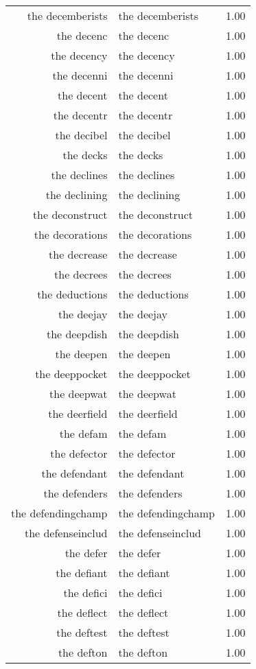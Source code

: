 \begin{table}[ht]
\begin{tabular}{rlr}
  the decemberists & the decemberists & 1.00 \\ 
  the decenc & the decenc & 1.00 \\ 
  the decency & the decency & 1.00 \\ 
  the decenni & the decenni & 1.00 \\ 
  the decent & the decent & 1.00 \\ 
  the decentr & the decentr & 1.00 \\ 
  the decibel & the decibel & 1.00 \\ 
  the decks & the decks & 1.00 \\ 
  the declines & the declines & 1.00 \\ 
  the declining & the declining & 1.00 \\ 
  the deconstruct & the deconstruct & 1.00 \\ 
  the decorations & the decorations & 1.00 \\ 
  the decrease & the decrease & 1.00 \\ 
  the decrees & the decrees & 1.00 \\ 
  the deductions & the deductions & 1.00 \\ 
  the deejay & the deejay & 1.00 \\ 
  the deepdish & the deepdish & 1.00 \\ 
  the deepen & the deepen & 1.00 \\ 
  the deeppocket & the deeppocket & 1.00 \\ 
  the deepwat & the deepwat & 1.00 \\ 
  the deerfield & the deerfield & 1.00 \\ 
  the defam & the defam & 1.00 \\ 
  the defector & the defector & 1.00 \\ 
  the defendant & the defendant & 1.00 \\ 
  the defenders & the defenders & 1.00 \\ 
  the defendingchamp & the defendingchamp & 1.00 \\ 
  the defenseinclud & the defenseinclud & 1.00 \\ 
  the defer & the defer & 1.00 \\ 
  the defiant & the defiant & 1.00 \\ 
  the defici & the defici & 1.00 \\ 
  the deflect & the deflect & 1.00 \\ 
  the deftest & the deftest & 1.00 \\ 
  the defton & the defton & 1.00 \\ 

\end{tabular}
\end{table}
